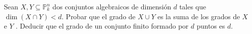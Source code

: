 \documentclass[twoside]{article}
\begin{document}
\newpage

\begin{ejercicio}{2}
 
Sean $X, Y ⊆ \mathbb{P}^n_k$
dos conjuntos algebraicos de dimensión $d$ tales
que $\dim(X ∩Y ) < d$. Probar que el grado de $X ∪Y$ es la suma de los grados de
$X$ e $Y$ . Deducir que el grado de un conjunto finito formado por $d$ puntos es $d$.
\end{ejercicio}

\begin{solucion}
\end{solucion}
\end{document}
